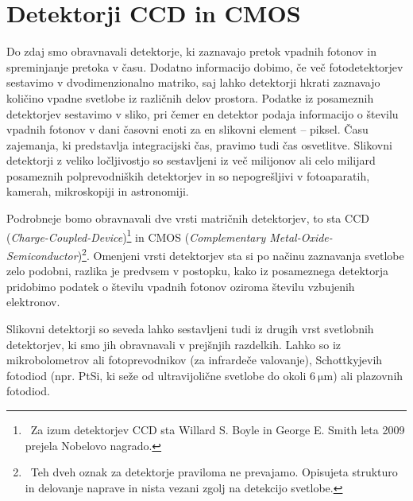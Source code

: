 \section{Detektorji CCD in CMOS}
Do zdaj smo obravnavali detektorje, 
ki zaznavajo pretok vpadnih fotonov in spreminjanje
pretoka v času. Dodatno informacijo dobimo, če več fotodetektorjev sestavimo v 
dvodimenzionalno matriko, saj lahko detektorji hkrati zaznavajo količino vpadne svetlobe 
iz različnih delov prostora. Podatke iz posameznih detektorjev sestavimo v sliko, pri čemer 
en detektor podaja informacijo o številu vpadnih fotonov 
v dani časovni enoti za en slikovni element -- piksel. Času zajemanja, ki
predstavlja integracijski čas, pravimo tudi čas osvetlitve.  
Slikovni detektorji z veliko ločljivostjo so sestavljeni iz 
več milijonov ali celo milijard posameznih polprevodniških detektorjev in so 
nepogrešljivi v fotoaparatih, kamerah, mikroskopiji in astronomiji.

Podrobneje bomo obravnavali dve vrsti matričnih detektorjev, to sta CCD 
({\it Charge-Coupled-Device})\footnote{~Za izum detektorjev CCD sta Willard 
S. Boyle in George E. Smith  leta 2009 prejela Nobelovo nagrado.} 
in CMOS ({\it Complementary Metal-Oxide-Semiconductor})\footnote{~Teh 
dveh oznak za detektorje praviloma ne prevajamo. Opisujeta 
strukturo in delovanje naprave in nista vezani zgolj na detekcijo svetlobe.}. Omenjeni vrsti
detektorjev sta si po načinu zaznavanja svetlobe zelo podobni, razlika
je predvsem v postopku, kako iz posameznega detektorja pridobimo podatek o številu 
vpadnih fotonov oziroma številu vzbujenih elektronov.

\begin{remark}
Slikovni detektorji so seveda lahko sestavljeni tudi iz drugih vrst svetlobnih detektorjev, 
ki smo jih obravnavali v prejšnjih razdelkih. Lahko so iz mikrobolometrov
ali fotoprevodnikov (za infrardeče valovanje),
Schottkyjevih fotodiod (npr. PtSi, ki seže od ultravijolične svetlobe do
okoli $6~\si{\micro\meter}$) ali plazovnih fotodiod.
\end{remark}

